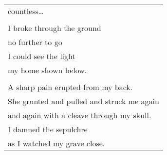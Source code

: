 \documentclass{article}
\begin{document}
\begin{tabular}{l}
countless\ldots{} \\
\\
I broke through the ground \\
no further to go \\
I could see the light \\
my home shown below. \\
\\
A sharp pain erupted from my back. \\
She grunted and pulled and struck me again \\
and again with a cleave through my skull. \\
I damned the sepulchre \\
as I watched my grave close. \\
\end{tabular} \\
\end{document}
